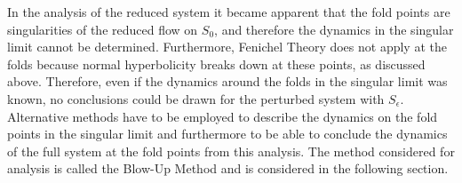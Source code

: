 In the analysis of the reduced system it became apparent that the fold points are singularities of the reduced flow on $S_0$, and therefore the dynamics in the singular limit cannot be determined. Furthermore, Fenichel Theory does not apply at the folds because normal hyperbolicity breaks down at these points, as discussed above. Therefore, even if the dynamics around the folds in the singular limit was known, no conclusions could be drawn for the perturbed system with $S_\epsilon$.
Alternative methods have to be employed to describe the dynamics on the fold points in the singular limit and furthermore to be able to conclude the dynamics of the full system at the fold points from this analysis.
The method considered for analysis is called the Blow-Up Method and is considered in the following section.























 